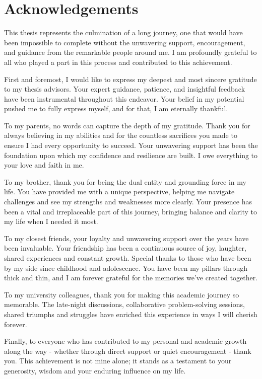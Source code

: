 \chapter*{Acknowledgements}

This thesis represents the culmination of a long journey, one that would have been impossible to complete without the unwavering support, encouragement, and guidance from the remarkable people around me. I am profoundly grateful to all who played a part in this process and contributed to this achievement.

First and foremost, I would like to express my deepest and most sincere gratitude to my thesis advisors. Your expert guidance, patience, and insightful feedback have been instrumental throughout this endeavor. Your belief in my potential pushed me to fully express myself, and for that, I am eternally thankful.

To my parents, no words can capture the depth of my gratitude. Thank you for always believing in my abilities and for the countless sacrifices you made to ensure I had every opportunity to succeed. Your unwavering support has been the foundation upon which my confidence and resilience are built. I owe everything to your love and faith in me.

To my brother, thank you for being the dual entity and grounding force in my life. You have provided me with a unique perspective, helping me navigate challenges and see my strengths and weaknesses more clearly. Your presence has been a vital and irreplaceable part of this journey, bringing balance and clarity to my life when I needed it most.

To my closest friends, your loyalty and unwavering support over the years have been invaluable. Your friendship has been a continuous source of joy, laughter, shared experiences and constant growth. Special thanks to those who have been by my side since childhood and adolescence. You have been my pillars through thick and thin, and I am forever grateful for the memories we've created together.

To my university colleagues, thank you for making this academic journey so memorable. The late-night discussions, collaborative problem-solving sessions, shared triumphs and struggles have enriched this experience in ways I will cherish forever.

Finally, to everyone who has contributed to my personal and academic growth along the way - whether through direct support or quiet encouragement - thank you. This achievement is not mine alone; it stands as a testament to your generosity, wisdom and your enduring influence on my life.